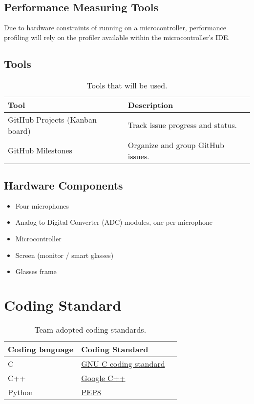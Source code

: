 \documentclass{article}
\begin{document}
\subsection{Performance Measuring Tools}
Due to hardware constraints of running on a microcontroller, performance
profiling will rely on the profiler available within the microcontroller’s IDE.

\subsection{Tools}
\begin{table}[h!]
\centering
\begin{tabularx}{\textwidth}{|l|X|}
\hline
\textbf{Tool} & \textbf{Description} \\ \hline
GitHub Projects (Kanban board) & Track issue progress and status. \\ \hline
GitHub Milestones & Organize and group GitHub issues. \\ \hline
\end{tabularx}
\caption{Tools that will be used.}
\end{table}

\subsection{Hardware Components}
\begin{itemize}
  \item Four microphones
  \item Analog to Digital Converter (ADC) modules, one per microphone
  \item Microcontroller
  \item Screen (monitor / smart glasses)
  \item Glasses frame
\end{itemize}


\section{Coding Standard}\label{sec:coding_standards}

\begin{table}[h!]
\centering
\begin{tabularx}{\textwidth}{|l|X|X|}
\hline
\textbf{Coding language} & \textbf{Coding Standard} \\ \hline
C & \href{https://www.gnu.org/prep/standards/html_node/Writing-C.html}{GNU C
coding standard} \\ \hline
C++ & \href{https://google.github.io/styleguide/cppguide.html}{Google C++} \\
\hline
Python & \href{https://peps.python.org/pep-0008/}{PEP8} \\ \hline
\end{tabularx}
\caption{Team adopted coding standards.}
\end{table}
\end{document}
